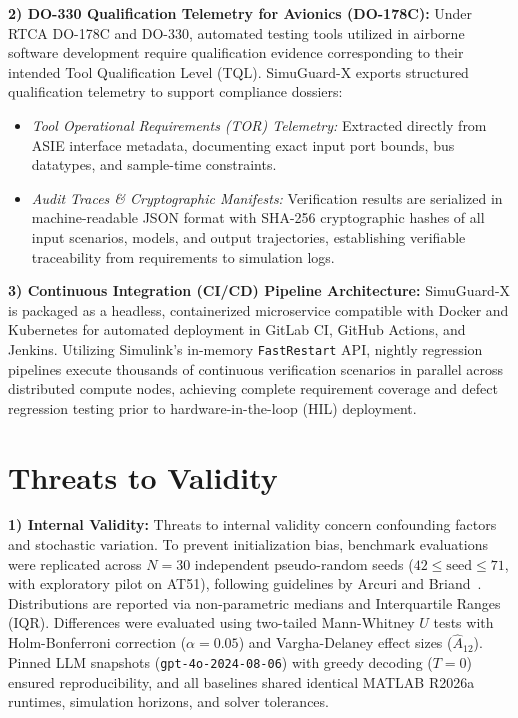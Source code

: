 \documentclass[journal]{IEEEtran}
\begin{document}
\noindent\textbf{2) DO-330 Qualification Telemetry for Avionics (DO-178C):}
Under RTCA DO-178C and DO-330, automated testing tools utilized in airborne software development require qualification evidence corresponding to their intended Tool Qualification Level (TQL). SimuGuard-X exports structured qualification telemetry to support compliance dossiers:
\begin{itemize}
    \item \textit{Tool Operational Requirements (TOR) Telemetry:} Extracted directly from ASIE interface metadata, documenting exact input port bounds, bus datatypes, and sample-time constraints.
    \item \textit{Audit Traces \& Cryptographic Manifests:} Verification results are serialized in machine-readable JSON format with SHA-256 cryptographic hashes of all input scenarios, models, and output trajectories, establishing verifiable traceability from requirements to simulation logs.
\end{itemize}

\noindent\textbf{3) Continuous Integration (CI/CD) Pipeline Architecture:}
SimuGuard-X is packaged as a headless, containerized microservice compatible with Docker and Kubernetes for automated deployment in GitLab CI, GitHub Actions, and Jenkins. Utilizing Simulink's in-memory \texttt{FastRestart} API, nightly regression pipelines execute thousands of continuous verification scenarios in parallel across distributed compute nodes, achieving complete requirement coverage and defect regression testing prior to hardware-in-the-loop (HIL) deployment.

\section{Threats to Validity}
\label{sec:threats_to_validity}
\noindent\textbf{1) Internal Validity:}
Threats to internal validity concern confounding factors and stochastic variation. To prevent initialization bias, benchmark evaluations were replicated across $N = 30$ independent pseudo-random seeds ($42 \le \text{seed} \le 71$, with exploratory pilot on AT51), following guidelines by Arcuri and Briand~\cite{arcuri2011practical}. Distributions are reported via non-parametric medians and Interquartile Ranges (IQR). Differences were evaluated using two-tailed Mann-Whitney $U$ tests with Holm-Bonferroni correction ($\alpha = 0.05$) and Vargha-Delaney effect sizes ($\hat{A}_{12}$). Pinned LLM snapshots (\texttt{gpt-4o-2024-08-06}) with greedy decoding ($T = 0$) ensured reproducibility, and all baselines shared identical MATLAB R2026a runtimes, simulation horizons, and solver tolerances.
\end{document}
